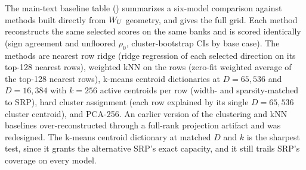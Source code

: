 The main-text baseline table ()
summarizes a six-model comparison against methods built directly from
\(W_U\) geometry, and  gives the full
grid. Each method reconstructs the same selected scores on the same
banks and is scored identically (sign agreement and unfloored
\(\rho_0\), cluster-bootstrap CIs by base case). The methods are
nearest row ridge (ridge regression of each selected direction on
its top-128 nearest rows), weighted kNN on the rows (zero-fit weighted
average of the top-128 nearest rows), k-means centroid
dictionaries at \(D=65{,}536\) and \(D=16{,}384\) with \(k=256\) active
centroids per row (width- and sparsity-matched to SRP),
hard cluster assignment (each row explained by its single
\(D=65{,}536\) cluster centroid), and PCA-256. An earlier version
of the clustering and kNN baselines over-reconstructed through a
full-rank projection artifact and was redesigned. The k-means centroid dictionary at matched \(D\) and \(k\) is the
sharpest test, since it grants the alternative SRP's exact capacity, and
it still trails SRP's coverage on every model.

